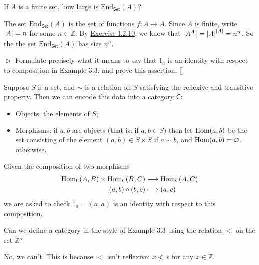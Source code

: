 \begin{problem}[3.2]
	If $A$ is a finite set, how large is $\mathrm{End}_{\mathsf{Set}}(A)$?
\end{problem}
\begin{solution}
	The set $\mathrm{End}_{\mathsf{Set}}(A)$ is the set of functions $f:A\to A$.
	Since $A$ is finite, write $\left|A\right| = n$ for some $n\in\mathbb{Z}$. By \hyperlink{Exercise I.2.10}{Exercise I.2.10}, we know that $\left|A^A\right| = \left|A\right|^{\left|A\right|} = n^n$. So the the set
	$\mathrm{End}_{\mathsf{Set}}(A)$ has size $n^n$.
\end{solution}



\begin{problem}[3.3]
	$\vartriangleright$ Formulate precisely what it means to say that $1_a$ is an identity with respect to composition in Example 3.3, and prove this assertion. []
\end{problem}
\begin{solution}
	Suppose $S$ is a set, and $\sim$ is a relation on $S$ satisfying the reflexive and transitive property. Then we can encode this data into a category $\mathsf{C}$:
	\begin{itemize}
		\item Objects: the elements of $S$;
		\item Morphisms: if $a, b$ are objects (that is: if $a, b \in S$) then let $\mathrm{Hom}(a, b)$ be the set consisting of the element $(a, b) \in S \times S$ if $a \sim b$, and $\mathrm{Hom}(a, b) = \varnothing$.
		otherwise.
	\end{itemize}
    Given the composition of two morphisms
	\begin{align*}
		\mathrm{Hom}_\mathsf{C}(A,B) \times\mathrm{Hom}_\mathsf{C}(B,C)&\longrightarrow\mathrm{Hom}_\mathsf{C}(A,C)\\
		(a,b)\circ(b,c)&\longmapsto(a,c)
	\end{align*}
	we are asked to check $1_a = (a, a)$ is an identity with respect
	to this composition.
\end{solution}

\begin{problem}[3.4]
	Can we define a category in the style of Example 3.3 using the relation $<$ on
	the set $\mathbb{Z}$?
\end{problem}
\begin{solution}
	No, we can't. This is because $<$ isn't reflexive: $x\not<x$ for any
	$x\in\mathbb{Z}$.
\end{solution}


